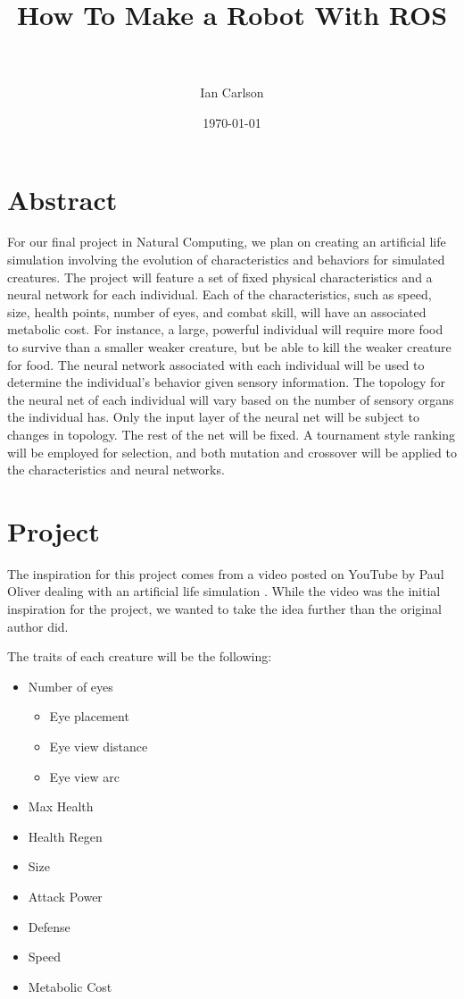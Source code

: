 \documentclass[paper=a4, fontsize=11pt]{scrartcl} %
\title{	
\normalfont \normalsize 
\huge How To Make a Robot With ROS \\ %
\horrule{2pt} \\[0.5cm] %
}
\author{Ian Carlson} %
\date{\normalsize\today} %
\numberwithin{equation}{section} %
\numberwithin{figure}{section} %
\numberwithin{table}{section} %
\begin{document}
\maketitle %


\section*{Abstract}

For our final project in Natural Computing, we plan on creating an artificial life simulation involving the evolution of characteristics and behaviors for simulated creatures. The project will feature a set of fixed physical characteristics and a neural network for each individual. Each of the characteristics, such as speed, size, health points, number of eyes, and combat skill, will have an associated metabolic cost. For instance, a large, powerful individual will require more food to survive than a smaller weaker creature, but be able to kill the weaker creature for food. The neural network associated with each individual will be used to determine the individual's behavior given sensory information. The topology for the neural net of each individual will vary based on the number of sensory organs the individual has. Only the input layer of the neural net will be subject to changes in topology. The rest of the net will be fixed. A tournament style ranking will be employed for selection, and both mutation and crossover will be applied to the characteristics and neural networks.

\section*{Project}%

The inspiration for this project comes from a video posted on YouTube by Paul Oliver dealing with an artificial life simulation \cite{oliver}. While the video was the initial inspiration for the project, we wanted to take the idea further than the original author did.

The traits of each creature will be the following:

\begin{itemize}[noitemsep]
  \item Number of eyes
  \begin{itemize}[noitemsep]
     \item Eye placement
     \item Eye view distance
     \item Eye view arc
  \end{itemize}
  \item Max Health
  \item Health Regen
  \item Size
  \item Attack Power
  \item Defense
  \item Speed
  \item Metabolic Cost
\end{itemize}
\end{document}
